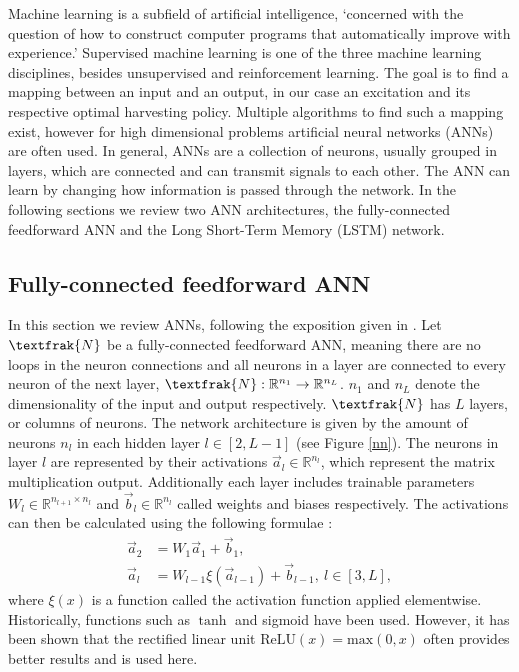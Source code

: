 Machine learning is a subfield of artificial intelligence, `concerned with the question of how to construct computer programs that automatically improve with experience.' \cite{Mitchell97}
Supervised machine learning is one of the three machine learning disciplines, besides unsupervised and reinforcement learning.
The goal is to find a mapping between an input and an output, in our case an excitation and its respective optimal harvesting policy.
Multiple algorithms to find such a mapping exist, however for high dimensional problems artificial neural networks (ANNs) are often used.
In general, ANNs are a collection of neurons, usually grouped in layers, which are connected and can transmit signals to each other.
The ANN can learn by changing how information is passed through the network.
In the following sections we review two ANN architectures, the fully-connected feedforward ANN and the Long Short-Term Memory (LSTM) network.

\subsection{Fully-connected feedforward ANN}
In this section we review ANNs, following the exposition given in \cite{lu2020dying}.
Let $\textfrak{N}$ be a fully-connected feedforward ANN, meaning there are no loops in the neuron connections and all neurons in a layer are connected to every neuron of the next layer, $\textfrak{N}: \mathbb{R}^{n_1} \to \mathbb{R}^{n_L}$. $n_1$ and $n_L$ denote the dimensionality of the input and output respectively. 
$\textfrak{N}$ has $L$ layers, or columns of neurons.
The network architecture is given by the amount of neurons $n_l$ in each hidden layer $l \in [2, L - 1]$ (see Figure \ref{nn}).
The neurons in layer $l$ are represented by their activations $\vec{a}_l \in \mathbb{R}^{n_l}$, which represent the matrix multiplication output. Additionally each layer includes trainable parameters $W_l \in \mathbb{R}^{n_{l+1} \times n_{l}}$ and $\vec{b}_l \in \mathbb{R}^{n_l}$ called weights and biases respectively.
The activations can then be calculated using the following formulae \cite{TN_libero_mab2)53517}:
\begin{align*}
	\vec{a}_2 & = W_1 \vec{a}_1 + \vec{b}_1, \\
	\vec{a}_l & = W_{l-1} \xi(\vec{a}_{l-1}) + \vec{b}_{l-1}, \ l \in [3, L],
\end{align*}
where $\xi(x)$ is a function called the activation function applied elementwise. Historically, functions such as $\tanh$ and sigmoid have been used. However, it has been shown \cite{Maas2013RectifierNI, krizhevsky} that the rectified linear unit $\mathrm{ReLU}(x) = \mathrm{max}(0, x)$ often provides better results and is used here.

